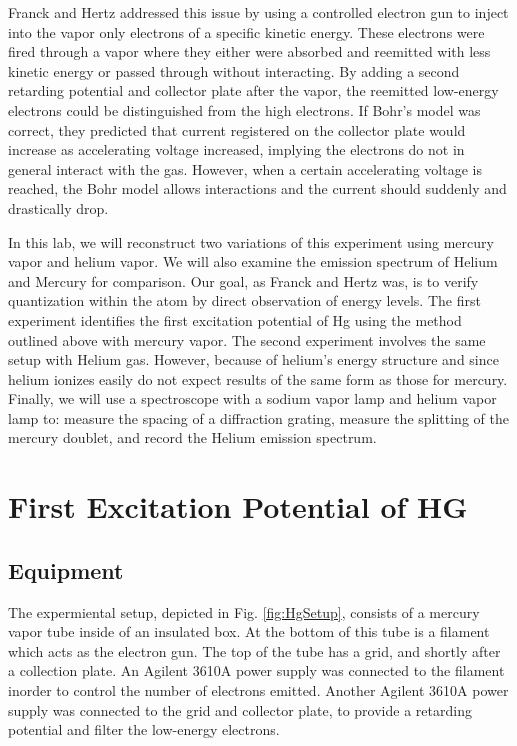 \documentclass[12pt,twocolumn]{article}
\begin{document}
Franck and Hertz addressed this issue by using a controlled electron gun to inject into the vapor only electrons of a specific kinetic energy. These electrons were fired through a vapor where they either were absorbed and reemitted with less kinetic energy or passed through without interacting. By adding a second retarding potential and collector plate after the vapor, the reemitted low-energy electrons could be distinguished from the high electrons. If Bohr's model was correct, they predicted that current registered on the collector plate would increase as accelerating voltage increased, implying the electrons do not in general interact with the gas. However, when a certain accelerating voltage is reached, the Bohr model allows interactions and the current should suddenly and drastically drop.

In this lab, we will reconstruct two variations of this experiment using mercury vapor and helium vapor. We will also examine the emission spectrum of Helium and Mercury for comparison. Our goal, as Franck and Hertz was, is to verify quantization within the atom by direct observation of energy levels. The first experiment identifies the first excitation potential of Hg using the method outlined above with mercury vapor. The second experiment involves the same setup with Helium gas. However, because of helium's energy structure and since helium ionizes easily do not expect results of the same form as those for mercury. Finally, we will use a spectroscope with a sodium vapor lamp and helium vapor lamp to: measure the spacing of a diffraction grating, measure the splitting of the mercury doublet, and record the Helium emission spectrum.

\section{First Excitation Potential of HG} %

\subsection{Equipment}

The expermiental setup, depicted in Fig. \ref{fig:HgSetup}, consists of a mercury vapor tube inside of an insulated box. At the bottom of this tube is a filament which acts as the electron gun. The top of the tube has a grid, and shortly after a collection plate. An Agilent 3610A power supply was connected to the filament inorder to control the number of electrons emitted. Another Agilent 3610A power supply was connected to the grid and collector plate, to provide a retarding potential and filter the low-energy electrons.
\end{document}
